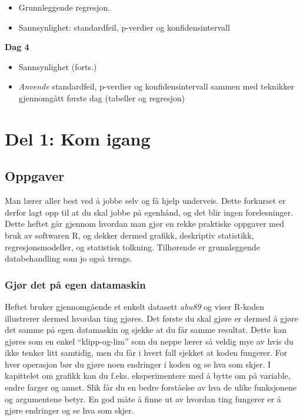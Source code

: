 \documentclass[
  letterpaper,
  DIV=11,
  numbers=noendperiod]{scrreprt}
\providecommand{\tightlist}{%
  \setlength{\itemsep}{0pt}\setlength{\parskip}{0pt}}\usepackage{longtable,booktabs,array}
\theoremstyle{definition}
\theoremstyle{remark}
\begin{document}
\begin{itemize}
\tightlist
\item
  Grunnleggende regresjon.
\item
  Sannsynlighet: standardfeil, p-verdier og konfidensintervall
\end{itemize}

\textbf{Dag 4}

\begin{itemize}
\tightlist
\item
  Sannsynlighet (forts.)
\item
  \emph{Anvende} standardfeil, p-verdier og konfidensintervall sammen
  med teknikker gjennomgått første dag (tabeller og regresjon)
\end{itemize}

\part{Del 1: Kom igang}

\hypertarget{oppgaver}{%
\chapter{Oppgaver}\label{oppgaver}}

Man lærer aller best ved å jobbe selv og få hjelp underveis. Dette
forkurset er derfor lagt opp til at du skal jobbe på egenhånd, og det
blir ingen forelesninger. Dette heftet går gjennom hvordan man gjør en
rekke praktiske oppgaver med bruk av softwaren R, og dekker dermed
grafikk, deskriptiv statistikk, regresjonsmodeller, og statistisk
tolkning. Tilhørende er grunnleggende databehandling som jo også trengs.

\hypertarget{gjuxf8r-det-puxe5-egen-datamaskin}{%
\section{Gjør det på egen
datamaskin}\label{gjuxf8r-det-puxe5-egen-datamaskin}}

Heftet bruker gjennomgående et enkelt datasett \emph{abu89} og viser
R-koden illustrerer dermed hvordan ting gjøres. Det første du skal gjøre
er dermed å gjøre det samme på egen datamaskin og sjekke at du får samme
resultat. Dette kan gjøres som en enkel ``klipp-og-lim'' som du neppe
lærer så veldig mye av hvis du ikke tenker litt samtidig, men du får i
hvert fall sjekket at koden fungerer. For hver operasjon bør du gjøre
noen endringer i koden og se hva som skjer. I kapittelet om grafikk kan
du f.eks. eksperimentere med å bytte om på variable, endre farger og
annet. Slik får du en bedre forståelse av hva de ulike funksjonene og
argumentene betyr. En god måte å finne ut av hvordan ting fungerer er å
gjøre endringer og se hva som skjer.
\end{document}
